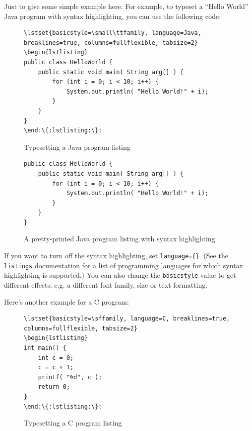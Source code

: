Just to give some simple example here.  For example, to typeset a ``Hello World'' Java program with syntax highlighting, you can use the following code:

\begin{figure}[hbt!]
  \begin{lstlisting}[escapechar=:,language={}]
\lstset{basicstyle=\small\ttfamily, language=Java, breaklines=true, columns=fullflexible, tabsize=2}
\begin{lstlisting}
public class HelloWorld {
	public static void main( String arg[] ) {
        for (int i = 0; i < 10; i++) {
			System.out.println( "Hello World!" + i);
		}
	}
}
\end:\{:lstlisting:\}:
\end{lstlisting}
  \caption{Typesetting a Java program listing}\label{fig:lst:syntax}
\end{figure}

\begin{figure}[hbt!]
  \lstset{basicstyle=\small\ttfamily, language=Java, breaklines=true, columns=fullflexible, framesep=10pt, xleftmargin=16pt, tabsize=2}
  \begin{lstlisting}
public class HelloWorld {
	public static void main( String arg[] ) {
        for (int i = 0; i < 10; i++) {
			System.out.println( "Hello World!" + i);
		}
	}
}
\end{lstlisting}
  \caption{A pretty-printed Java program listing with syntax highlighting}
\end{figure}


If you want to turn off the syntax highlighting, set \verb|language={}|.  (See the \verb|listings| documentation for a list of programming languages for which syntax highlighting is supported.)  You can also change the \verb|basicstyle| value to get different effects: e.g. a different font family, size or text formatting.

Here's another example for a C program:

\begin{figure}[hbt!]
  \begin{lstlisting}[escapechar={:}, texcl=false,language={}]
\lstset{basicstyle=\sffamily, language=C, breaklines=true, columns=fullflexible, tabsize=2}
\begin{lstlisting}
int main() {
	int c = 0;
	c = c + 1;
	printf( "%d", c );
	return 0;
}
\end:\{:lstlisting:\}:
\end{lstlisting}
  \caption{Typesetting a C program listing}\label{fig:lst:c}
\end{figure}

